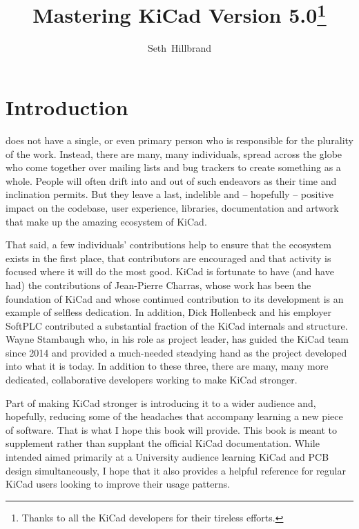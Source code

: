 \documentclass{tufte-book}
\title{Mastering KiCad Version 5.0\thanks{Thanks to all the KiCad developers for their tireless efforts.}}
\author[Seth Hillbrand]{Seth~Hillbrand}
\begin{document}

\cleardoublepage
\chapter*{Introduction}

 does not have a single, or even primary person who is responsible for the plurality of the work.
Instead, there are many, many individuals, spread across the globe who come together over mailing lists and bug trackers to create something as a whole.
People will often drift into and out of such endeavors as their time and inclination permits.
But they leave a last, indelible and -- hopefully -- positive impact on the codebase, user experience, libraries, documentation and artwork that make up the amazing ecosystem of KiCad.

That said, a few individuals' contributions help to ensure that the ecosystem exists in the first place, that contributors are encouraged and that activity is focused where it will do the most good.
KiCad is fortunate to have (and have had) the contributions of Jean-Pierre Charras, whose work has been the foundation of KiCad and whose continued contribution to its development is an example of selfless dedication.
In addition, Dick Hollenbeck and his employer SoftPLC contributed a substantial fraction of the KiCad internals and structure.
Wayne Stambaugh who, in his role as project leader, has guided the KiCad team since 2014 and provided a much-needed steadying hand as the project developed into what it is today.
In addition to these three, there are many, many more dedicated, collaborative developers working to make KiCad stronger.

Part of making KiCad stronger is introducing it to a wider audience and, hopefully, reducing some of the headaches that accompany learning a new piece of software.
That is what I hope this book will provide.
This book is meant to supplement rather than supplant the official KiCad documentation.
While intended aimed primarily at a University audience learning KiCad and PCB design simultaneously, I hope that it also provides a helpful reference for regular KiCad users looking to improve their usage patterns.

\mainmatter


%
%
%
%
%
%
%
%
%
%
%


\backmatter





\printindex
\end{document}

